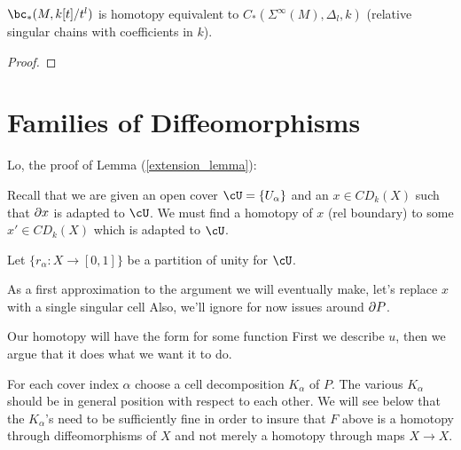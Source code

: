 \documentclass[11pt,leqno]{amsart}
\begin{document}
\begin{prop}
$\bc_*(M, k[t]/t^l)$ is homotopy equivalent to $C_*(\Sigma^\infty(M), \Delta_l, k)$
(relative singular chains with coefficients in $k$).
\end{prop}

\begin{proof}
\end{proof}





\appendix

\section{Families of Diffeomorphisms}  \label{sec:localising}


Lo, the proof of Lemma (\ref{extension_lemma}):




Recall that we are given
an open cover $\cU = \{U_\alpha\}$ and an
$x \in CD_k(X)$ such that $\partial x$ is adapted to $\cU$.
We must find a homotopy of $x$ (rel boundary) to some $x' \in CD_k(X)$ which is adapted to $\cU$.

Let $\{r_\alpha : X \to [0,1]\}$ be a partition of unity for $\cU$.

As a first approximation to the argument we will eventually make, let's replace $x$
with a single singular cell
Also, we'll ignore for now issues around $\partial P$.

Our homotopy will have the form
for some function
First we describe $u$, then we argue that it does what we want it to do.

For each cover index $\alpha$ choose a cell decomposition $K_\alpha$ of $P$.
The various $K_\alpha$ should be in general position with respect to each other.
We will see below that the $K_\alpha$'s need to be sufficiently fine in order
to insure that $F$ above is a homotopy through diffeomorphisms of $X$ and not
merely a homotopy through maps $X\to X$.
\end{document}
